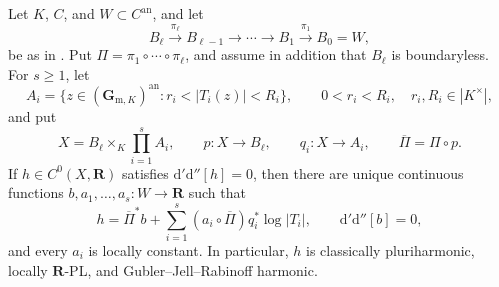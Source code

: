\begin{corollary}
\label{cor:p062-open-polyannulus-over-mixed-bundle-towers}
Let $K$, $C$, and $W\subset C^{\mathrm{an}}$, and let
\[
 B_\ell\xrightarrow{\pi_\ell}B_{\ell-1}
 \longrightarrow\cdots\longrightarrow B_1
 \xrightarrow{\pi_1}B_0=W,
\]
be as in .  Put
$\Pi=\pi_1\circ\cdots\circ\pi_\ell$, and assume in addition that
$B_\ell$ is boundaryless.  For $s\geq1$, let
\[
 A_i=\{z\in(\mathbf G_{\mathrm m,K})^{\mathrm{an}}:
                    r_i<|T_i(z)|<R_i\},
 \qquad 0<r_i<R_i,\quad r_i,R_i\in|K^\times|,
\]
and put
\[
 X=B_\ell\times_K\prod_{i=1}^sA_i,
 \qquad p:X\longrightarrow B_\ell,
 \qquad q_i:X\longrightarrow A_i,
 \qquad \overline\Pi=\Pi\circ p.
\]
If $h\in C^0(X,\mathbf R)$ satisfies
$\mathrm d'\mathrm d''[h]=0$, then there are unique continuous functions
$b,a_1,\ldots,a_s:W\to\mathbf R$ such that
\[
 h=\overline\Pi^*b+
   \sum_{i=1}^s(a_i\circ\overline\Pi)q_i^*\log|T_i|,
 \qquad \mathrm d'\mathrm d''[b]=0,
\]
and every $a_i$ is locally constant.  In particular, $h$ is classically
pluriharmonic, locally $\mathbf R$-PL, and Gubler--Jell--Rabinoff harmonic.
\end{corollary}
